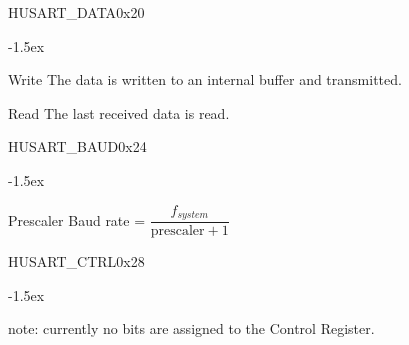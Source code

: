 \documentclass[12pt]{article}
\begin{document}
\begin{register}{H}{USART\_DATA}{0x20}
\label{usartdata}
\regnewline%
\end{register}
\begin{regdesc}[0.6\textwidth]\begin{reglist}[000000000]
\itemsep-1.5ex
\item[Write] The data is written to an internal buffer and transmitted.
\item[Read] The last received data is read.
\end{reglist}\end{regdesc}

\begin{register}{H}{USART\_BAUD}{0x24}
\label{usartbaud}
\regnewline%
\end{register}
\begin{regdesc}[0.6\textwidth]\begin{reglist}[000000000]
\itemsep-1.5ex
\item[Prescaler] Baud rate = $\dfrac{f_{system}}{\textrm{prescaler}+1}$
\end{reglist}\end{regdesc}

\begin{register}{H}{USART\_CTRL}{0x28}
\label{usartctrl}
\regnewline%
\end{register}
\begin{regdesc}[0.6\textwidth]\begin{reglist}[00000]
\itemsep-1.5ex
\item [note:] currently no bits are assigned to the Control Register.
\end{reglist}\end{regdesc}
\end{document}
